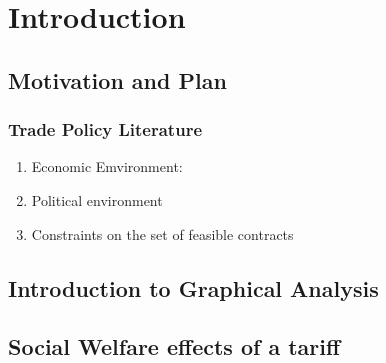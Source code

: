 \section{Introduction}

\subsection{Motivation and Plan}

\subsubsection{Trade Policy Literature}
\begin{enumerate}
    \item Economic Emvironment:
    \item Political environment
    \item Constraints on the set of feasible contracts
\end{enumerate}

\subsection{Introduction to Graphical Analysis}


\subsection{Social Welfare effects of a tariff}


